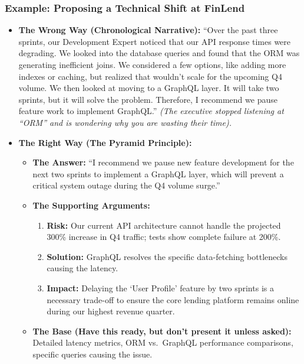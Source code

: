 \documentclass[
  11pt,
  openany,
  oneside]{book}
\providecommand{\tightlist}{%
  \setlength{\itemsep}{0pt}\setlength{\parskip}{0pt}}
\begin{document}
\subsubsection{Example: Proposing a Technical Shift at
FinLend}\label{example-proposing-a-technical-shift-at-finlend}

\begin{itemize}
\item
  \textbf{The Wrong Way (Chronological Narrative):} ``Over the past
  three sprints, our Development Expert noticed that our API response
  times were degrading. We looked into the database queries and found
  that the ORM was generating inefficient joins. We considered a few
  options, like adding more indexes or caching, but realized that
  wouldn't scale for the upcoming Q4 volume. We then looked at moving to
  a GraphQL layer. It will take two sprints, but it will solve the
  problem. Therefore, I recommend we pause feature work to implement
  GraphQL.'' \emph{(The executive stopped listening at ``ORM'' and is
  wondering why you are wasting their time).}
\item
  \textbf{The Right Way (The Pyramid Principle):}

  \begin{itemize}
  \tightlist
  \item
    \textbf{The Answer:} ``I recommend we pause new feature development
    for the next two sprints to implement a GraphQL layer, which will
    prevent a critical system outage during the Q4 volume surge.''
  \item
    \textbf{The Supporting Arguments:}

    \begin{enumerate}
    \def\labelenumi{\arabic{enumi}.}
    \tightlist
    \item
      \textbf{Risk:} Our current API architecture cannot handle the
      projected 300\% increase in Q4 traffic; tests show complete
      failure at 200\%.
    \item
      \textbf{Solution:} GraphQL resolves the specific data-fetching
      bottlenecks causing the latency.
    \item
      \textbf{Impact:} Delaying the `User Profile' feature by two
      sprints is a necessary trade-off to ensure the core lending
      platform remains online during our highest revenue quarter.
    \end{enumerate}
  \item
    \textbf{The Base (Have this ready, but don't present it unless
    asked):} Detailed latency metrics, ORM vs.~GraphQL performance
    comparisons, specific queries causing the issue.
  \end{itemize}
\end{itemize}
\end{document}

